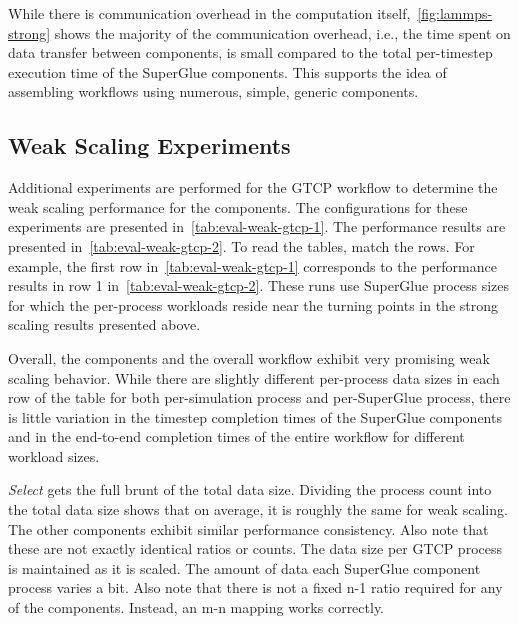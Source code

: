 While there is communication overhead in the computation itself,~\autoref{fig:lammps-strong} shows the majority of the communication
overhead, i.e., the time spent on data transfer between components,
is small compared to the total per-timestep execution time of
the SuperGlue components. This supports the idea
of assembling workflows using numerous, simple,
generic components.

\subsection{Weak Scaling Experiments}

Additional experiments are performed for the GTCP workflow to determine the
weak scaling performance for the components. The configurations for these experiments
are presented in~\autoref{tab:eval-weak-gtcp-1}. The performance results are
presented in~\autoref{tab:eval-weak-gtcp-2}. To read the tables, match the
rows. For example, the first row in~\autoref{tab:eval-weak-gtcp-1} corresponds
to the performance results in row 1 in~\autoref{tab:eval-weak-gtcp-2}.
These runs use SuperGlue process sizes for which the per-process
workloads reside near the turning points in the
strong scaling results presented above.

Overall, the components and the overall workflow
exhibit very promising weak scaling behavior.
While there are slightly different per-process
data sizes in each row of the table for both
per-simulation process and per-SuperGlue process,
there is little variation in the timestep completion
times of the SuperGlue components and in the end-to-end
completion times of the entire workflow for different
workload sizes.

{\em Select} gets the full brunt of the total data size. Dividing the process
count into the total data size shows that on average, it is roughly the same
for weak scaling. The other components exhibit similar performance consistency.
Also note that these are not exactly identical ratios or counts.  The data size
per GTCP process is maintained as it is scaled. The amount of data each
SuperGlue component process varies a bit. Also note that there is not a fixed
n-1 ratio required for any of the components. Instead, an m-n mapping works
correctly.


